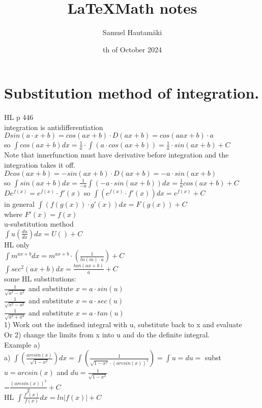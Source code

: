 \documentclass{article}
\title{\LaTeX Math notes}
\author{Samuel Hautamäki}
\date{th of October 2024}
\begin{document}
  \maketitle
   
  \section{Substitution method of integration.}
  HL p 446\\
  integration is antidifferentiation\\
  $D sin(a\cdot x+b)=cos(ax+b)\cdot D(ax+b)=cos(aax+b)\cdot a$\\
  so $\int cos(ax+b) dx = \frac{1}{a}\cdot\int (a\cdot cos(ax+b))=\frac{1}{a}\cdot sin(ax+b)+C$\\
  Note that innerfunction must have derivative before integration and the integration takes it off.\\
  $D cos(ax+b)=-sin(ax+b)\cdot D(ax+b)=-a\cdot sin(ax+b)$\\
  so $\int sin(ax+b)dx=\frac{1}{-a}\int (-a\cdot sin(ax+b))dx=\frac{1}{a}cos(ax+b)+C$\\
  $D e^{f(x)}=e^{f(x)}\cdot f'(x)$ so $\int (e^{f(x)}\cdot f'(x))dx =e^{f(x)} +C$\\
  in general $\int (f(g(x))\cdot g'(x))dx=F(g(x))+C$\\
  where $F'(x)=f(x)$\\
  u-substitution method\\ 
  $\int u(\frac{du}{dx})dx=U()+C$\\
  HL only\\
  $\int m^{ax+b} dx=m^{ax+b}\cdot(\frac{1}{ln(m)\cdot a})+C$\\
  $\int sec^2(ax+b)dx=\frac{tan(ax+b)}{a}+C$\\
  some HL substitutions:\\
  $\frac{1}{\sqrt{a^2-x^2}}$ and substitute $x=a\cdot sin(u)$\\
  $\frac{1}{\sqrt{x^2-a^2}}$ and substitute $x=a\cdot sec(u)$\\
  $\frac{1}{\sqrt{a^2+x^2}}$ and substitute $x=a\cdot tan(u)$\\
  1) Work out the indefined integral with u, substitute back to x and evaluate\\
  Or 2) change the limits from x into u and do the definite integral.\\
  Example a)\\
  a) $\int (\frac{arcsin(x)}{\sqrt{1-x^2}})dx=\int (\frac{1}{\sqrt{1-x^2}\cdot (arcsin(x))^1})=\int u =du=$
  subst $u=arcsin(x)$ and $du=\frac{1}{\sqrt{1-x^2}}$\\
  =$\frac{(arcsin(x))^2}{2}+C$\\ 
  HL $\int \frac{f'(x)}{f(x)}dx=ln|f(x)|+C$\\
  
\end{document}
